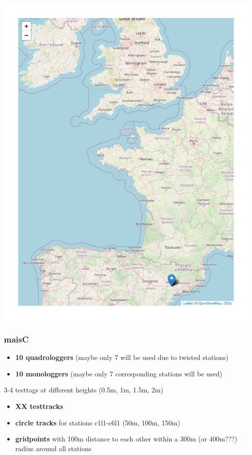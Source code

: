 \documentclass[
]{article}
\providecommand{\tightlist}{%
  \setlength{\itemsep}{0pt}\setlength{\parskip}{0pt}}\usepackage{longtable,booktabs,array}
\begin{document}
\includegraphics{MaisLE_ARTS_files/figure-pdf/figsite-1.pdf}

\subsubsection{maisC}\label{maisc}

\begin{itemize}
\tightlist
\item
  \textbf{10 quadrologgers} (maybe only 7 will be used due to twisted
  stations)\\
\item
  \textbf{10 monologgers} (maybe only 7 corresponding stations will be
  used)
\end{itemize}

3-4 testtags at different heights (0.5m, 1m, 1.5m, 2m)

\begin{itemize}
\tightlist
\item
  \textbf{XX testtracks}\\
\item
  \textbf{circle tracks} for stations c1l1-c6l1 (50m, 100m, 150m)\\
\item
  \textbf{gridpoints} with 100m distance to each other within a 300m (or
  400m???) radius around all stations
\end{itemize}
\end{document}
